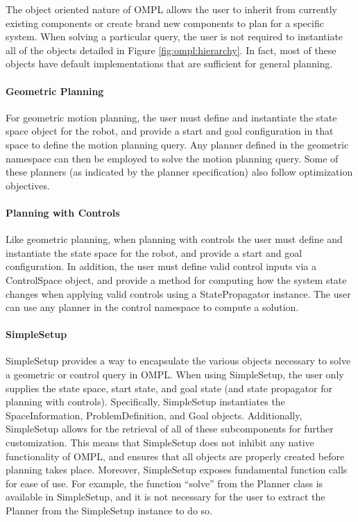 The object oriented nature of OMPL allows the user to inherit from currently
existing components or create brand new components to plan for a specific
system.  When solving a particular query, the user is not required to
instantiate all of the objects detailed in Figure \ref{fig:ompl:hierarchy}.
In fact, most of these objects have default implementations that are
sufficient for general planning.

\paragraph {Geometric Planning}
For geometric motion planning, the user must define and instantiate the state
space object for the robot, and provide a start and goal configuration in that
space to define the motion planning query.  Any planner defined in the
geometric namespace can then be employed to solve the motion planning query.
Some of these planners (as indicated by the planner specification) also follow
optimization objectives.

\paragraph {Planning with Controls}
Like geometric planning, when planning with controls the user must define and
instantiate the state space for the robot, and provide a start and goal
configuration.  In addition, the user must define valid control inputs via
a ControlSpace object, and provide a method for computing how the system state
changes when applying valid controls using a StatePropagator instance.  The
user can use any planner in the control namespace to compute a solution.

\paragraph {SimpleSetup}
SimpleSetup provides a way to encapsulate the various objects necessary to
solve a geometric or control query in OMPL.  When using SimpleSetup, the user
only supplies the state space, start state, and goal state (and state propagator
for planning with controls). Specifically, SimpleSetup instantiates the
SpaceInformation, ProblemDefinition, and Goal objects.  Additionally,
SimpleSetup allows for the retrieval of all of these subcomponents for further
customization.  This means that SimpleSetup does not inhibit any native
functionality of OMPL, and ensures that all objects are properly created before
planning takes place.  Moreover, SimpleSetup exposes fundamental function
calls for ease of use.  For example, the function ``solve'' from the Planner
class is available in SimpleSetup, and it is not necessary for the user to
extract the Planner from the SimpleSetup instance to do so.

